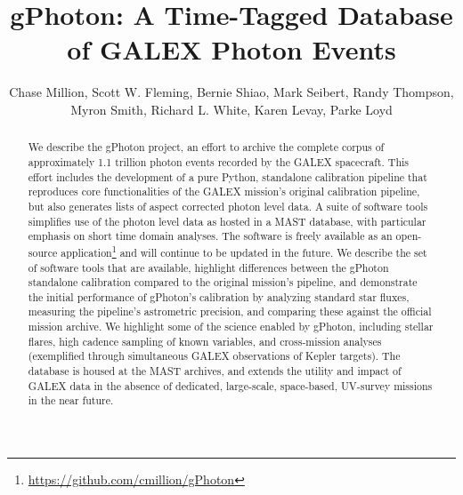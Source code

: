 \documentclass[preprint]{aastex}
\begin{document}
\title{gPhoton: A Time-Tagged Database of GALEX Photon Events}

\author{
Chase Million,
Scott W. Fleming,
Bernie Shiao,
Mark Seibert,
Randy Thompson,
Myron Smith,
Richard L. White,
Karen Levay,
Parke Loyd}


\begin{abstract}
We describe the gPhoton project, an effort to archive the complete corpus of approximately 1.1 trillion photon events recorded by the GALEX spacecraft. This effort includes the development of a pure Python, standalone calibration pipeline that reproduces core functionalities of the GALEX mission's original calibration pipeline, but also generates lists of aspect corrected photon level data. A suite of software tools simplifies use of the photon level data as hosted in a MAST database, with particular emphasis on short time domain analyses. The software is freely available as an open-source application\footnote{\url{https://github.com/cmillion/gPhoton}} and will continue to be updated in the future. We describe the set of software tools that are available, highlight differences between the gPhoton standalone calibration compared to the original mission's pipeline, and demonstrate the initial performance of gPhoton's calibration by analyzing standard star fluxes, measuring the pipeline's astrometric precision, and comparing these against the official mission archive. We highlight some of the science enabled by gPhoton, including stellar flares, high cadence sampling of known variables, and cross-mission analyses (exemplified through simultaneous GALEX observations of Kepler targets). The database is housed at the MAST archives, and extends the utility and impact of GALEX data in the absence of dedicated, large-scale, space-based, UV-survey missions in the near future.
\end{abstract}
\end{document}
